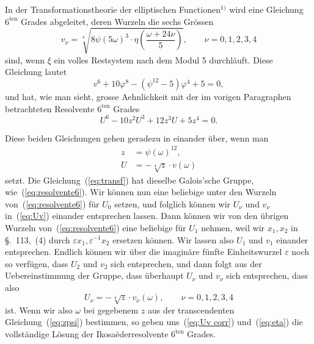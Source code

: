 \documentclass[12pt,a4paper]{article}
\begin{document}
In der Transformationstheorie der elliptischen Functionen$^{1)}$ wird eine Gleichung $6^{\text{ten}}$ Grades abgeleitet, deren Wurzeln die sechs Gr\"ossen
\[
v_{\nu} = \sqrt[4]{8\psi(5\omega)^3 \cdot \eta\left(\frac{\omega + 24\nu}{5}\right)}, \qquad \nu = 0, 1, 2, 3, 4
\]
sind, wenn $\xi$ ein volles Restsystem nach dem Modul 5 durchl\"auft. Diese Gleichung lautet
\begin{equation}
\label{eq:transf} v^6 + 10\varphi^8 - (\psi^{12} - 5)\varphi^4 + 5 = 0,
\end{equation}
und hat, wie man sieht, grosse Aehnlichkeit mit der im vorigen Paragraphen betrachteten Resolvente $6^{\text{ten}}$ Grades
\begin{equation}
\label{eq:resolvente6} U^6 - 10z^2 U^3 + 12z^3 U + 5z^4 = 0.
\end{equation}

Diese beiden Gleichungen gehen geradezu in einander \"uber, wenn man
\begin{align}
\label{eq:zpsi} z &= \psi(\omega)^{12},\\
\label{eq:Uv} U &= -\sqrt[4]{z} \cdot v(
\omega)
\end{align}
setzt. Die Gleichung~(\ref{eq:transf}) hat dieselbe Galois'sche Gruppe, wie~(\ref{eq:resolvente6}). Wir k\"onnen nun eine beliebige unter den Wurzeln von~(\ref{eq:resolvente6}) f\"ur $U_0$ setzen, und folglich k\"onnen wir $U_{\nu}$ und $v_{\nu}$ in~(\ref{eq:Uv}) einander entsprechen lassen. Dann k\"onnen wir von den \"ubrigen Wurzeln von~(\ref{eq:resolvente6}) eine beliebige f\"ur $U_1$ nehmen, weil wir $x_1, x_2$ in \S.~113,~(4) durch $\varepsilon x_1, \varepsilon^{-1}x_2$ ersetzen k\"onnen. Wir lassen also $U_1$ und $v_1$ einander entsprechen. Endlich k\"onnen wir \"uber die imagin\"are f\"unfte Einheitswurzel $\varepsilon$ noch so verf\"ugen, dass $U_2$ und $v_2$ sich entsprechen, und dann folgt aus der Uebereinstimmung der Gruppe, dass \"uberhaupt $U_{\nu}$ und $v_{\nu}$ sich entsprechen, dass also
\begin{equation}
\label{eq:Uv corr} U_{\nu} = -\sqrt[4]{z} \cdot v_{\nu}(\omega), \qquad \nu = 0, 1, 2, 3, 4
\end{equation}
ist. Wenn wir also $\omega$ bei gegebenem $z$ aus der transcendenten Gleichung~(\ref{eq:zpsi}) bestimmen, so geben uns~(\ref{eq:Uv corr}) und~(\ref{eq:eta}) die vollst\"andige L\"osung der Ikosa\"ederresolvente $6^{\text{ten}}$ Grades.
\end{document}
